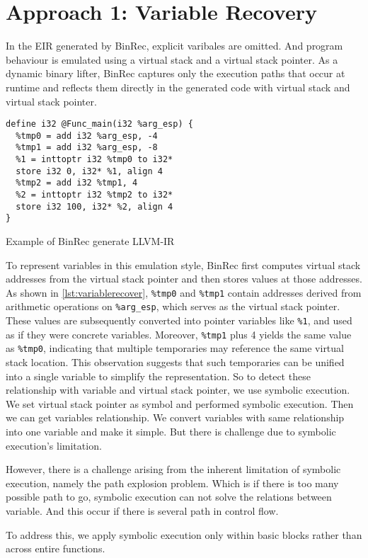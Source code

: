 \section{Approach 1: Variable Recovery}
In the EIR generated by BinRec, explicit varibales are omitted. And program
behaviour is emulated using a virtual stack and a virtual stack pointer. As a
dynamic binary lifter, BinRec captures only the execution paths that occur at
runtime and reflects them directly in the generated code with virtual stack and
virtual stack pointer.
\begin{listing}[ht]
\begin{verbatim}
define i32 @Func_main(i32 %arg_esp) {
  %tmp0 = add i32 %arg_esp, -4
  %tmp1 = add i32 %arg_esp, -8
  %1 = inttoptr i32 %tmp0 to i32*
  store i32 0, i32* %1, align 4
  %tmp2 = add i32 %tmp1, 4
  %2 = inttoptr i32 %tmp2 to i32*
  store i32 100, i32* %2, align 4
}
\end{verbatim}
\caption{Example of BinRec generate LLVM-IR}
\label{lst:variablerecover}
\end{listing}

To represent variables in this emulation style, BinRec first computes virtual
stack addresses from the virtual stack pointer and then stores values at those
addresses. As shown in \autoref{lst:variablerecover}, \texttt{\%tmp0} and \texttt{\%tmp1} contain
addresses derived from arithmetic operations on \texttt{\%arg\_esp}, which
serves as the virtual stack pointer. These values are subsequently converted
into pointer variables like \texttt{\%1}, and used as if they were concrete
variables. Moreover, \texttt{\%tmp1} plus 4 yields the same value as
\texttt{\%tmp0}, indicating that multiple temporaries may reference the same
virtual stack location. This observation suggests that such temporaries can be
unified into a single variable to simplify the representation.
So to detect these relationship with variable and virtual stack pointer, we use
symbolic execution. We set virtual stack pointer as symbol and performed
symbolic execution. Then we can get variables relationship. We convert
variables with same relationship into one variable and make it simple. But
there is challenge due to symbolic execution’s limitation. 

However, there is a challenge arising from the inherent limitation of symbolic
execution\cite{symex-limit}, namely the path explosion problem. Which is if there is too many
possible path to go, symbolic execution can not solve the relations between
variable. And this occur if there is several path in control flow. 

To address this, we apply symbolic execution only within basic blocks rather
than across entire functions.
